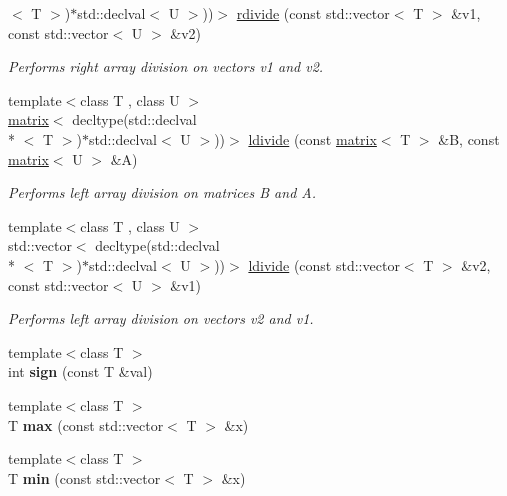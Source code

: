 \begin{DoxyCompactItemize}
$<$ T $>$)$\ast$std\-::declval$<$ U $>$))$>$ \hyperlink{namespacekeycpp_af234cd07a4e1d649629a6b83dbe113ff}{rdivide} (const std\-::vector$<$ T $>$ \&v1, const std\-::vector$<$ U $>$ \&v2)
\begin{DoxyCompactList}\small\item\em Performs right array division on vectors v1 and v2. \end{DoxyCompactList}\item 
{\footnotesize template$<$class T , class U $>$ }\\\hyperlink{classkeycpp_1_1matrix}{matrix}$<$ decltype(std\-::declval\\*
$<$ T $>$)$\ast$std\-::declval$<$ U $>$))$>$ \hyperlink{namespacekeycpp_ac57d32902cba2c399475015235aeccec}{ldivide} (const \hyperlink{classkeycpp_1_1matrix}{matrix}$<$ T $>$ \&B, const \hyperlink{classkeycpp_1_1matrix}{matrix}$<$ U $>$ \&A)
\begin{DoxyCompactList}\small\item\em Performs left array division on matrices B and A. \end{DoxyCompactList}\item 
{\footnotesize template$<$class T , class U $>$ }\\std\-::vector$<$ decltype(std\-::declval\\*
$<$ T $>$)$\ast$std\-::declval$<$ U $>$))$>$ \hyperlink{namespacekeycpp_a7a86bc7e25833cdf9266c038a4edb0ea}{ldivide} (const std\-::vector$<$ T $>$ \&v2, const std\-::vector$<$ U $>$ \&v1)
\begin{DoxyCompactList}\small\item\em Performs left array division on vectors v2 and v1. \end{DoxyCompactList}\item 
\hypertarget{namespacekeycpp_a87f2917e6a7c8e20d010aea0d8480668}{{\footnotesize template$<$class T $>$ }\\int {\bfseries sign} (const T \&val)}\label{namespacekeycpp_a87f2917e6a7c8e20d010aea0d8480668}

\item 
\hypertarget{namespacekeycpp_a646c5e616337a8174bd39ce729e53612}{{\footnotesize template$<$class T $>$ }\\T {\bfseries max} (const std\-::vector$<$ T $>$ \&x)}\label{namespacekeycpp_a646c5e616337a8174bd39ce729e53612}

\item 
\hypertarget{namespacekeycpp_a28171fa81d0f537dd058e63164410b43}{{\footnotesize template$<$class T $>$ }\\T {\bfseries min} (const std\-::vector$<$ T $>$ \&x)}\label{namespacekeycpp_a28171fa81d0f537dd058e63164410b43}


\end{DoxyCompactItemize}

